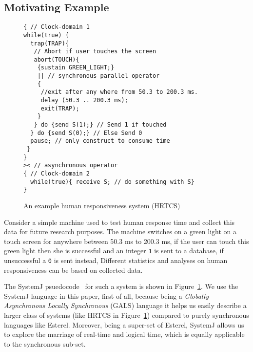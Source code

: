\subsection{Motivating Example}
\label{sec:motivating-example}

\begin{figure}[t!]
\begin{minipage}{5cm}
  \begin{scriptsize}
    
\begin{verbatim}
{ // Clock-domain 1
while(true) {
  trap(TRAP){
   // Abort if user touches the screen
   abort(TOUCH){
    {sustain GREEN_LIGHT;}
    || // synchronous parallel operator
    {
     //exit after any where from 50.3 to 200.3 ms.
     delay (50.3 .. 200.3 ms);
     exit(TRAP); 
    }
   } do {send S(1);} // Send 1 if touched 
  } do {send S(0);} // Else Send 0
  pause; // only construct to consume time
 }
}
>< // asynchronous operator
{ // Clock-domain 2
  while(true){ receive S; // do something with S}
}
\end{verbatim}
  \end{scriptsize}
\end{minipage}
\caption{An example human responsiveness system (HRTCS)}
\label{fig:1}
\end{figure}

Consider a simple machine used to test human response time and collect
this data for future research purposes. The machine switches on a green
light on a touch screen for anywhere between 50.3 ms to 200.3 ms, if the
user can touch this green light then she is successful and an integer
\texttt{1} is sent to a database, if unsuccessful a \texttt{0} is sent
instead, Different statistics and analyses on human responsiveness can
be based on collected data.

The SystemJ psuedocode~\cite{amal10} for such a system is shown in
Figure~\ref{fig:1}. We use the SystemJ language in this paper, first of
all, because being a \textit{Globally Asynchronous Locally Synchronous}
(GALS) language it helps us easily describe a larger class of systems
(like HRTCS in Figure~\ref{fig:1}) compared to purely synchronous
languages like Esterel. Moreover, being a super-set of Esterel, SystemJ
allows us to explore the marriage of real-time and logical time, which
is equally applicable to the synchronous sub-set.

